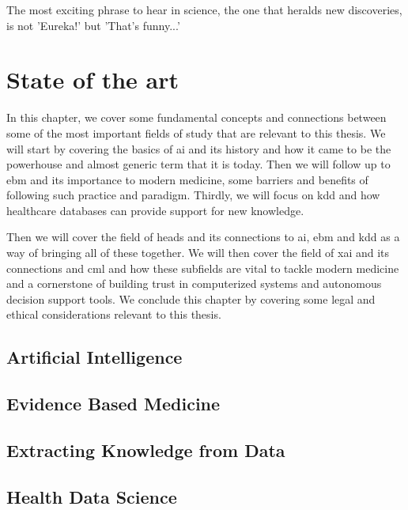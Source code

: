 \begin{savequote}[75mm]
The most exciting phrase to hear in science, the one that heralds new discoveries, is not 'Eureka!' but 'That's funny...'
\end{savequote}
\chapter{State of the art} \label{chap:sota}


In this chapter, we cover some fundamental concepts and connections between some of the most important fields of study that are relevant to this thesis. We will start by covering the basics of \ac{ai} and its history and how it came to be the powerhouse and almost generic term that it is today. Then we will follow up to \ac{ebm} and its importance to modern medicine, some barriers and benefits of following such practice and paradigm. Thirdly, we will focus on \ac{kdd} and how healthcare databases can provide support for new knowledge.

Then we will cover the field of \ac{heads} and its connections to \ac{ai}, \ac{ebm} and \ac{kdd} as a way of bringing all of these together. We will then cover the field of \ac{xai} and its connections and \ac{cml} and how these subfields are vital to tackle modern medicine and a cornerstone of building trust in computerized systems and autonomous decision support tools. We conclude this chapter by covering some legal and ethical considerations relevant to this thesis.


\section{Artificial Intelligence}


\section{Evidence Based Medicine}\label{subsec:ebm}




\section{Extracting Knowledge from Data}\label{sec:kdd}



\section{Health Data Science}

